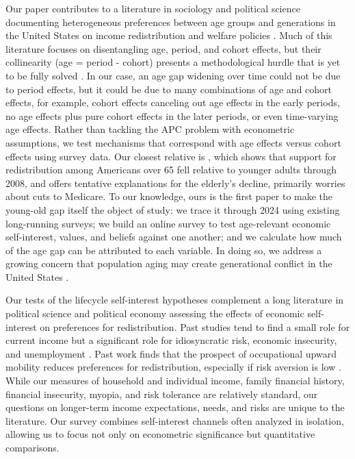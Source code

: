 \documentclass{article}
\begin{document}
Our paper contributes to a literature in sociology and political science documenting heterogeneous preferences between age groups and generations in the United States on income redistribution and welfare policies \citep{busemeyer2009attitudes, fullerton2010generational, pittau2016attitude, lin2018government, meuleman2019economic, ghitza2023great, jocker2024growing}. Much of this literature focuses on disentangling age, period, and cohort effects, but their collinearity (age = period - cohort) presents a methodological hurdle that is yet to be fully solved \citep{fosse2019analyzing}. In our case, an age gap widening over time could not be due to period effects, but it could be due to many combinations of age and cohort effects, for example, cohort effects canceling out age effects in the early periods, no age effects plus pure cohort effects in the later periods, or even time-varying age effects. Rather than tackling the APC problem with econometric assumptions, we test mechanisms that correspond with age effects versus cohort effects using survey data. Our closest relative is \cite{ashok2015support}, which shows that support for redistribution among Americans over 65 fell relative to younger adults through 2008, and offers tentative explanations for the elderly’s decline, primarily worries about cuts to Medicare. To our knowledge, ours is the first paper to make the young-old gap itself the object of study: we trace it through 2024 using existing long-running surveys; we build an online survey to test age-relevant economic self-interest, values, and beliefs against one another; and we calculate how much of the age gap can be attributed to each variable. In doing so, we address a growing concern that population aging may create generational conflict in the United States \citep{campbell2003policies,goerres2010age,vlandas2021ageing,munger2022generation}.

Our tests of the lifecycle self-interest hypotheses complement a long literature in political science and political economy assessing the effects of economic self-interest on preferences for redistribution. Past studies tend to find a small role for current income \citep{frohlich1987laboratory, sears1990limited, landier2008investigating} but a significant role for idiosyncratic risk, economic insecurity, and unemployment \citep{cusack2006risks, rehm2009risks, owens2013material, gartner2017individual, thewissen2019automation, melcher2023economic}. Past work finds that the prospect of occupational upward mobility reduces preferences for redistribution, especially if risk aversion is low \citep{rainer2008subjective, cojocaru2014prospects}. While our measures of household and individual income, family financial history, financial insecurity, myopia, and risk tolerance are relatively standard, our questions on longer-term income expectations, needs, and risks are unique to the literature. Our survey combines self-interest channels often analyzed in isolation, allowing us to focus not only on econometric significance but quantitative comparisons.
\end{document}
